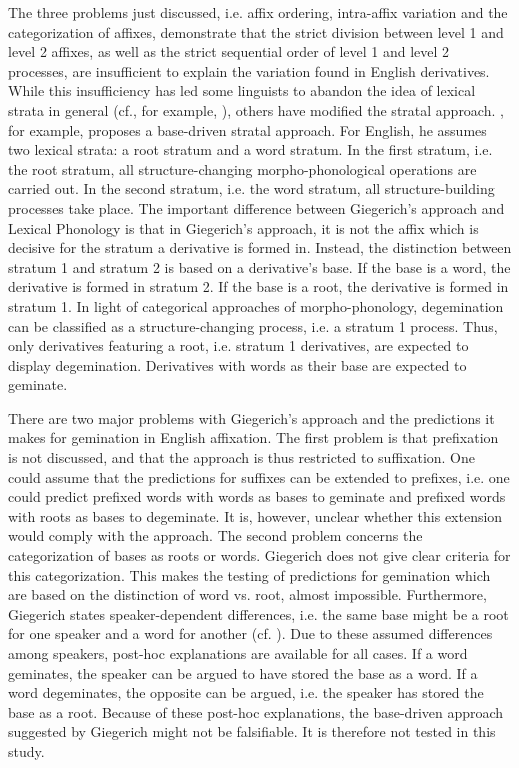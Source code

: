 The three problems just discussed, i.e. affix ordering, intra-affix variation and the categorization of affixes, demonstrate that the strict division between level 1 and level 2 affixes, as well as the strict sequential order of level 1 and level 2 processes, are insufficient to explain the variation found in English derivatives. While this insufficiency has led some linguists to  abandon the idea of lexical strata in general (cf., for example, \citealt{Johnson.1997b,Bybee.2001,Pierrehumbert.2001,Hay.2001}), others have modified the stratal approach. 
\citealt{Giegerich.1999}, for example, proposes a base-driven stratal approach. For English, he assumes two lexical strata: a root stratum and a word stratum. In the first stratum, i.e. the root stratum, all structure-changing morpho-phonological operations are carried out. In the second stratum, i.e. the word stratum, all structure-building processes take place. The important difference between Giegerich's approach and Lexical Phonology is that in Giegerich's approach, it is not the affix which is decisive for the stratum a derivative is formed in. Instead, the distinction between stratum 1 and stratum 2 is based on a derivative's base. If the base is a word, the derivative is formed in stratum 2. If the base is a root, the derivative is formed in stratum 1. In light of categorical approaches of morpho-phonology, degemination can be classified as a structure-changing process, i.e. a stratum 1 process. Thus, only derivatives featuring a root, i.e. stratum 1 derivatives, are expected to display degemination. Derivatives with words as their base are expected to geminate.

There are two major problems with Giegerich's approach  and the predictions it makes for gemination in English affixation. The first problem is that prefixation is not discussed, and that the approach is thus restricted to suffixation. One could assume that the predictions for suffixes can be extended to prefixes, i.e. one could predict prefixed words with words as bases to geminate and prefixed words with roots as bases to degeminate. It is, however, unclear whether this extension would comply with the approach. %
The second problem concerns the categorization of bases as roots or words. Giegerich does not give clear criteria for this categorization. This makes the testing of predictions for gemination which are based on the distinction of word vs. root, almost impossible. 
Furthermore, Giegerich states speaker-dependent differences, i.e. the same base might be a root for one speaker and a word for another (cf. \citealt[chapter 3.2.1.]{Giegerich.1999}). 
Due to these assumed differences among speakers, post-hoc explanations are available for all cases. If a word geminates, the speaker can be argued to have stored the base as a word. If a word degeminates, the opposite can be argued, i.e. the speaker has stored the base as a root. Because of these post-hoc explanations, the base-driven approach suggested by Giegerich might not be falsifiable. It is therefore not tested in this study.

